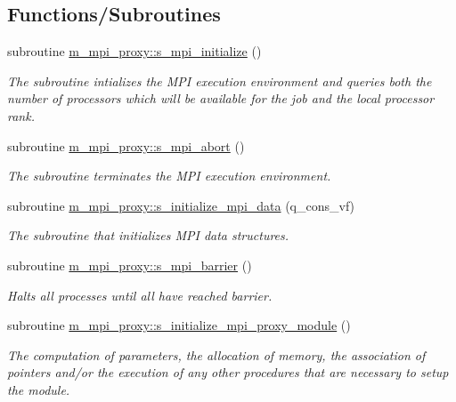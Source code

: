 \subsection*{Functions/\+Subroutines}
\begin{DoxyCompactItemize}
\item 
subroutine \hyperlink{namespacem__mpi__proxy_a9bc4c617505152d3cc553e5bc25c1ee1}{m\+\_\+mpi\+\_\+proxy\+::s\+\_\+mpi\+\_\+initialize} ()
\begin{DoxyCompactList}\small\item\em The subroutine intializes the M\+PI execution environment and queries both the number of processors which will be available for the job and the local processor rank. \end{DoxyCompactList}\item 
subroutine \hyperlink{namespacem__mpi__proxy_a04ac565bad2b22dc045a5eeb4f516e2e}{m\+\_\+mpi\+\_\+proxy\+::s\+\_\+mpi\+\_\+abort} ()
\begin{DoxyCompactList}\small\item\em The subroutine terminates the M\+PI execution environment. \end{DoxyCompactList}\item 
subroutine \hyperlink{namespacem__mpi__proxy_a2ff35ede51e90c483969e44c31303415}{m\+\_\+mpi\+\_\+proxy\+::s\+\_\+initialize\+\_\+mpi\+\_\+data} (q\+\_\+cons\+\_\+vf)
\begin{DoxyCompactList}\small\item\em The subroutine that initializes M\+PI data structures. \end{DoxyCompactList}\item 
subroutine \hyperlink{namespacem__mpi__proxy_abfbc42cea69273bc9fa4a2d78f636eb1}{m\+\_\+mpi\+\_\+proxy\+::s\+\_\+mpi\+\_\+barrier} ()
\begin{DoxyCompactList}\small\item\em Halts all processes until all have reached barrier. \end{DoxyCompactList}\item 
subroutine \hyperlink{namespacem__mpi__proxy_a015ee2c0892e9cfcb858da8f27b646d5}{m\+\_\+mpi\+\_\+proxy\+::s\+\_\+initialize\+\_\+mpi\+\_\+proxy\+\_\+module} ()
\begin{DoxyCompactList}\small\item\em The computation of parameters, the allocation of memory, the association of pointers and/or the execution of any other procedures that are necessary to setup the module. \end{DoxyCompactList}\item 

\end{DoxyCompactItemize}
